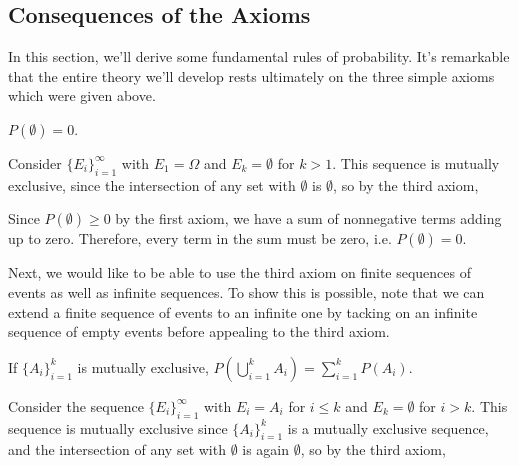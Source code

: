\subsection*{Consequences of the Axioms}
In this section, we'll derive some fundamental rules of probability. It's remarkable that the entire theory we'll develop rests ultimately on the three simple axioms which were given above.
\par
\begin{thm}\label{emptysetprob}
$P(\emptyset) = 0$.
\end{thm}
\begin{pf} Consider $\{E_i\}_{i=1}^{\infty}$ with $E_1 = \Omega$ and $E_k = \emptyset$ for $k > 1$. This sequence is mutually exclusive, since the intersection of any set with $\emptyset$ is $\emptyset$, so by the third axiom,
\par
\noindent Since $P(\emptyset) \geq 0$ by the first axiom, we have a sum of nonnegative terms adding up to zero. Therefore, every term in the sum must be zero, i.e. $P(\emptyset) = 0$.
\end{pf}
\par
Next, we would like to be able to use the third axiom on finite sequences of events as well as infinite sequences. To show this is possible, note that we can extend a finite sequence of events to an infinite one by tacking on an infinite sequence of empty events before appealing to the third axiom.
\begin{thm}\label{finiteadditivity}
If $\{A_i\}_{i=1}^k$ is mutually exclusive, $\displaystyle P(\bigcup_{i=1}^{k}A_i) = \sum_{i=1}^{k}P(A_i)$.
\end{thm}
\begin{pf} Consider the sequence $\{E_i\}_{i=1}^{\infty}$ with $E_i = A_i$ for $i \leq k$ and $E_k = \emptyset$ for $i > k$. This sequence is mutually exclusive since $\{A_i\}_{i=1}^k$ is a mutually exclusive sequence, and the intersection of any set with $\emptyset$ is again $\emptyset$, so by the third axiom,
\end{pf}
